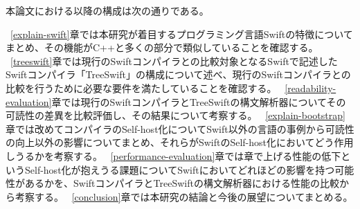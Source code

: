 本論文における以降の構成は次の通りである。

~\ref{explain-swift}章では本研究が着目するプログラミング言語Swiftの特徴についてまとめ、その機能がC++と多くの部分で類似していることを確認する。
~\ref{treeswift}章では現行のSwiftコンパイラとの比較対象となるSwiftで記述したSwiftコンパイラ「TreeSwift」の構成について述べ、現行のSwiftコンパイラとの比較を行うために必要な要件を満たしていることを確認する。
~\ref{readability-evaluation}章では現行のSwiftコンパイラとTreeSwiftの構文解析器についてその可読性の差異を比較評価し、その結果について考察する。
~\ref{explain-bootstrap}章では改めてコンパイラのSelf-host化についてSwift以外の言語の事例から可読性の向上以外の影響についてまとめ、それらがSwiftのSelf-host化においてどう作用しうるかを考察する。
~\ref{performance-evaluation}章では章で上げる性能の低下というSelf-host化が抱えうる課題についてSwiftにおいてどれほどの影響を持つ可能性があるかを、SwiftコンパイラとTreeSwiftの構文解析器における性能の比較から考察する。
~\ref{conclusion}章では本研究の結論と今後の展望についてまとめる。

